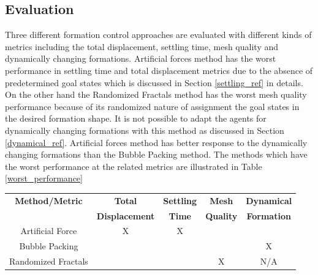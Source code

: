 \subsection{Evaluation} \label{evaluation_ref}
Three different formation control approaches are evaluated with different kinds of metrics including the total displacement, settling time, mesh quality and dynamically changing formations. Artificial forces method has the worst performance in settling time and total displacement metrics due to the absence of predetermined goal states which is discussed in Section \ref{settling_ref} in details. On the other hand the Randomized Fractals method has the worst mesh quality performance because of its randomized nature of assignment the goal states in the desired formation shape. It is not possible to adapt the agents for dynamically changing formations with this method as discussed in Section \ref{dynamical_ref}. Artificial forces method has better response to the dynamically changing formations than the Bubble Packing method. The methods which have the worst performance at the related metrics are illustrated in Table \ref{worst_performance}
		
\begin{center}
 \label{worst_performance} 
\begin{tabular}{||c| c| c | c | c||}
				
\hline
\textbf{Method/Metric} & \textbf{Total}  & \textbf{Settling} & \textbf{Mesh} & \textbf{Dynamical}\\ 
                       & \textbf{Displacement}  & \textbf{Time} & \textbf{Quality} & \textbf{Formation}\\
\hline
Artificial Force & X & X & & \\
Bubble Packing & &  & & X\\	
Randomized Fractals & &  & X & N/A \\	
\hline
\end{tabular}
\end{center}
		
